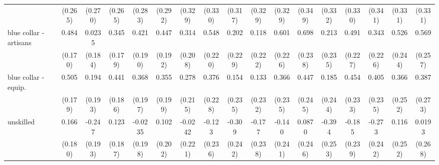 {\begin{tabular}{l*{16}{c}}
                    &     (0.265)         &     (0.270)         &     (0.265)         &     (0.283)         &     (0.292)         &     (0.329)         &     (0.330)         &     (0.317)         &     (0.329)         &     (0.329)         &     (0.349)         &     (0.332)         &     (0.330)         &     (0.341)         &     (0.331)         &     (0.331)         \\
[1em]
blue collar - artisans&       0.484\sym{**} &      0.0235         &       0.345         &       0.421\sym{*}  &       0.447\sym{*}  &       0.314         &       0.548\sym{*}  &       0.202         &       0.118         &       0.601\sym{**} &       0.698\sym{**} &       0.213         &       0.491\sym{*}  &       0.343         &       0.526\sym{*}  &       0.569\sym{*}  \\
                    &     (0.170)         &     (0.184)         &     (0.179)         &     (0.190)         &     (0.192)         &     (0.208)         &     (0.220)         &     (0.229)         &     (0.222)         &     (0.226)         &     (0.238)         &     (0.235)         &     (0.227)         &     (0.226)         &     (0.244)         &     (0.257)         \\
[1em]
blue collar - equip.&       0.505\sym{**} &       0.194         &       0.441\sym{*}  &       0.368         &       0.355         &       0.278         &       0.376         &       0.154         &       0.133         &       0.366         &       0.447         &       0.185         &       0.454         &       0.405         &       0.366         &       0.387         \\
                    &     (0.179)         &     (0.193)         &     (0.186)         &     (0.197)         &     (0.199)         &     (0.215)         &     (0.228)         &     (0.235)         &     (0.232)         &     (0.235)         &     (0.245)         &     (0.244)         &     (0.233)         &     (0.235)         &     (0.252)         &     (0.273)         \\
[1em]
unskilled           &       0.166         &      -0.247         &       0.123         &     -0.0235         &       0.102         &     -0.0242         &      -0.123         &      -0.309         &      -0.177         &      -0.140         &      0.0870         &      -0.394         &      -0.185         &      -0.273         &       0.116         &      0.0193         \\
                    &     (0.180)         &     (0.193)         &     (0.187)         &     (0.198)         &     (0.202)         &     (0.221)         &     (0.236)         &     (0.242)         &     (0.238)         &     (0.241)         &     (0.246)         &     (0.253)         &     (0.239)         &     (0.242)         &     (0.252)         &     (0.268)         \\

\end{tabular}}
